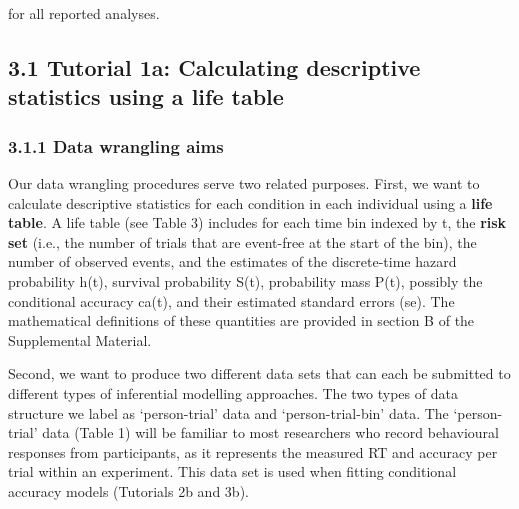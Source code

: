 \documentclass[
  english,
  man, donotrepeattitle,floatsintext]{apa6}
\begin{document}
for all reported analyses.

\subsection{3.1 Tutorial 1a: Calculating descriptive statistics using a life table}\label{tutorial-1a-calculating-descriptive-statistics-using-a-life-table}

\subsubsection{3.1.1 Data wrangling aims}\label{data-wrangling-aims}

Our data wrangling procedures serve two related purposes. First, we want to calculate descriptive statistics for each condition in each individual using a \textbf{life table}. A life table (see Table 3) includes for each time bin indexed by t, the \textbf{risk set} (i.e., the number of trials that are event-free at the start of the bin), the number of observed events, and the estimates of the discrete-time hazard probability h(t), survival probability S(t), probability mass P(t), possibly the conditional accuracy ca(t), and their estimated standard errors (se). The mathematical definitions of these quantities are provided in section B of the Supplemental Material.

Second, we want to produce two different data sets that can each be submitted to different types of inferential modelling approaches. The two types of data structure we label as `person-trial' data and `person-trial-bin' data. The `person-trial' data (Table 1) will be familiar to most researchers who record behavioural responses from participants, as it represents the measured RT and accuracy per trial within an experiment. This data set is used when fitting conditional accuracy models (Tutorials 2b and 3b).





\renewcommand{\arraystretch}{1.5}
\end{document}
